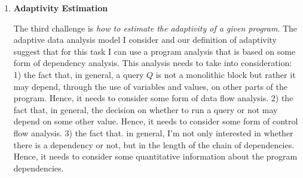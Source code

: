 \begin{enumerate}
\item 
\textbf{Adaptivity Estimation}

The third challenge is \emph{how to estimate the adaptivity of a given program}. 
The adaptive data analysis model I consider and our definition of adaptivity suggest that for this task I can use a program analysis that is based on some form of dependency analysis. This analysis needs to take into consideration:
1) the fact that, in general, a query $Q$ is not a monolithic block but rather it may depend, through the use of variables and values, on other parts of the program. 
Hence, it needs to consider some form of data flow analysis. 
2) the fact that, in general, the decision on whether to run a query or not may depend on some other value. Hence, 
 it needs to consider some form of control flow analysis.
3) the fact that. in general, I'm not only interested in whether there is a dependency or not, but in the length of the chain of dependencies. 
Hence, it needs to consider some quantitative information about the program dependencies. %


\end{enumerate}
